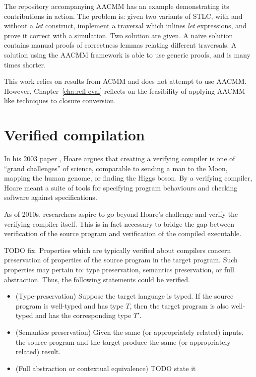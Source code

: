 \documentclass[bsc,frontabs,oneside,singlespacing,parskip,deptreport]{infthesis}
\theoremstyle{definition}
\theoremstyle{lemma}
\begin{document}
The repository accompanying AACMM has an example demonstrating its
contributions in action. The problem is: given two variants of STLC,
with and without a \textit{let} construct, implement a traversal which
inlines \textit{let} expressions, and prove it correct with a
simulation. Two solution are given. A naive solution contains manual
proofs of correctness lemmas relating different traversals. A solution
using the AACMM framework is able to use generic proofs, and is many
times shorter.

This work relies on results from ACMM and does not attempt to use
AACMM. However, Chapter~\ref{cha:refl-eval} reflects on the
feasibility of applying AACMM-like techniques to closure conversion.

\section{Verified compilation}
\label{sec:verified-compilation}

In his 2003 paper \cite{hoare2003verifying}, Hoare argues that
creating a verifying compiler is one of ``grand challenges'' of
science, comparable to sending a man to the Moon, mapping the human
genome, or finding the Higgs boson. By a verifying compiler, Hoare
meant a suite of tools for specifying program behaviours and checking
software against specifications.

As of 2010s, researchers aspire to go beyond Hoare's challenge and
verify the verifying compiler itself. This is in fact necessary to
bridge the gap between verification of the source program and
verification of the compiled executable.

TODO fix. Properties which are typically verified about compilers
concern preservation of properties of the source program in the target
program. Such properties may pertain to: type preservation, semantics
preservation, or full abstraction. Thus, the following statements
could be verified.

\begin{itemize}
\item (Type-preservation) Suppose the target language is typed. If the
  source program is well-typed and has type $T$, then the target
  program is also well-typed and has the corresponding type $T'$.
\item (Semantics preservation) Given the same (or appropriately
  related) inputs, the source program and the target produce the same
  (or appropriately related) result.
\item (Full abstraction or contextual equivalence) TODO state it
\end{itemize}
\end{document}
